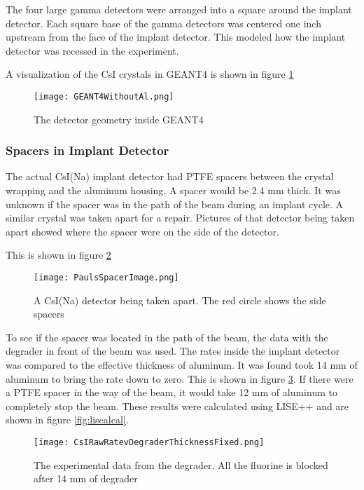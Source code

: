 The four large gamma detectors were arranged into a square around the implant detector.
Each square base of the gamma detectors was centered one inch upstream from the face of the implant detector.
This modeled how the implant detector was recessed in the experiment.

A visualization of the CsI crystals in GEANT4 is shown in figure \ref{fig:GEANT4Det}

\begin{figure}[!htb]
	\centerline{\texttt{[image: GEANT4WithoutAl.png]}}
	\caption{The detector geometry inside GEANT4}
	\label{fig:GEANT4Det}
\end{figure}

\subsubsection{Spacers in Implant Detector}
The actual CsI(Na) implant detector had PTFE spacers between the crystal wrapping and the aluminum housing.
A spacer would be 2.4 mm thick. 
It was unknown if the spacer was in the path of the beam during an implant cycle. 
A similar crystal was taken apart for a repair. 
Pictures of that detector being taken apart showed where the spacer were on the side of the detector. 

This is shown in figure \ref{fig:detpic}

\begin{figure}[!htb]
	\centerline{\texttt{[image: PaulsSpacerImage.png]}}
	\caption{A CsI(Na) detector being taken apart.
		 The red circle shows the side spacers}
	\label{fig:detpic}
\end{figure}

To see if the spacer was located in the path of the beam, the data with the degrader in front of the beam was used.
The rates inside the implant detector was compared to the effective thickness of aluminum. 
It was found took 14 mm of aluminum to bring the rate down to zero.
This is shown in figure \ref{fig:degraderdata}.
If there were a PTFE spacer in the way of the beam, it would take 12 mm of aluminum to completely stop the beam.
These results were calculated using LISE++ and are shown in figure \ref{fig:lisealcal}.

\begin{figure}[!htb]
	\centerline{\texttt{[image: CsIRawRatevDegraderThicknessFixed.png]}}
	\caption{The experimental data from the degrader. 
		 All the fluorine is blocked after 14 mm of degrader}
	\label{fig:degraderdata}
\end{figure}

